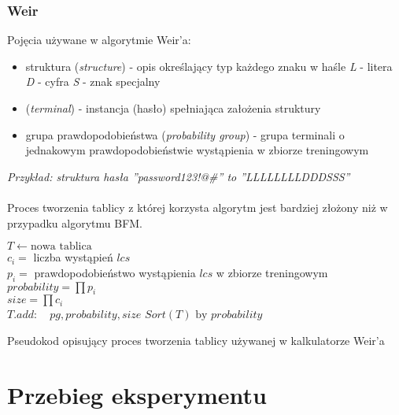 \documentclass{article}
\begin{document}
	\subsubsection{Weir}
	Pojęcia używane w algorytmie Weir'a:
	\begin{itemize}
		\item struktura (\textit{structure}) - opis określający typ każdego znaku w haśle
			\subitem \textit{L} - litera
			\subitem \textit{D} - cyfra
			\subitem \textit{S} - znak specjalny			
		\item (\textit{terminal}) - instancja (hasło) spełniająca założenia struktury
		\item grupa prawdopodobieństwa (\textit{probability group}) - grupa terminali o jednakowym prawdopodobieństwie wystąpienia w zbiorze treningowym
	\end{itemize}
	\textit{Przykład: struktura hasła ''password123!@\#'' to ''LLLLLLLLDDDSSS''} \\ \\
	
	
	Proces tworzenia tablicy z której korzysta algorytm jest bardziej złożony niż w przypadku algorytmu BFM.
	\begin{algorithm}
	$ T \gets \text{nowa tablica}$ \\
	{
		{
			{
				$c_{i} = $ liczba wystąpień $lcs$ \\
				$p_{i} = $ prawdopodobieństwo wystąpienia $lcs$ w zbiorze treningowym
			}
			$probability=\prod p_{i}$ \\
			$size=\prod c_{i}$ \\
			$T.add: \quad pg,probability,size$
		}		
	}
	$Sort(T) \text{ by } probability$
	\caption{Pseudokod opisujący proces tworzenia tablicy używanej w kalkulatorze Weir'a}
	\end{algorithm}
	
	
	\newpage
	\section{Przebieg eksperymentu}
\end{document}
